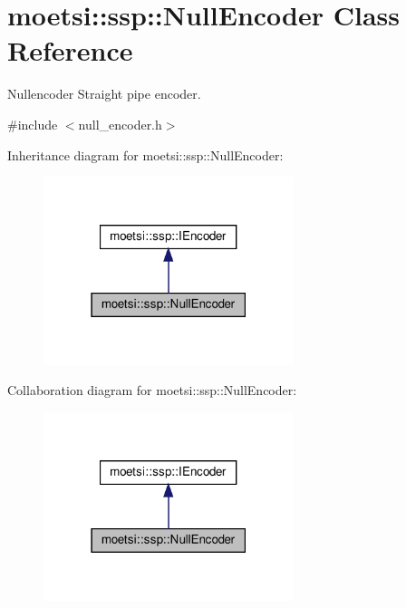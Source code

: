 \hypertarget{classmoetsi_1_1ssp_1_1NullEncoder}{}\section{moetsi\+:\+:ssp\+:\+:Null\+Encoder Class Reference}
\label{classmoetsi_1_1ssp_1_1NullEncoder}


Nullencoder Straight pipe encoder.  




{\ttfamily \#include $<$null\+\_\+encoder.\+h$>$}



Inheritance diagram for moetsi\+:\+:ssp\+:\+:Null\+Encoder\+:
\nopagebreak
\begin{figure}[H]
\begin{center}
\leavevmode
\includegraphics[width=207pt]{classmoetsi_1_1ssp_1_1NullEncoder__inherit__graph}
\end{center}
\end{figure}


Collaboration diagram for moetsi\+:\+:ssp\+:\+:Null\+Encoder\+:
\nopagebreak
\begin{figure}[H]
\begin{center}
\leavevmode
\includegraphics[width=207pt]{classmoetsi_1_1ssp_1_1NullEncoder__coll__graph}
\end{center}
\end{figure}
